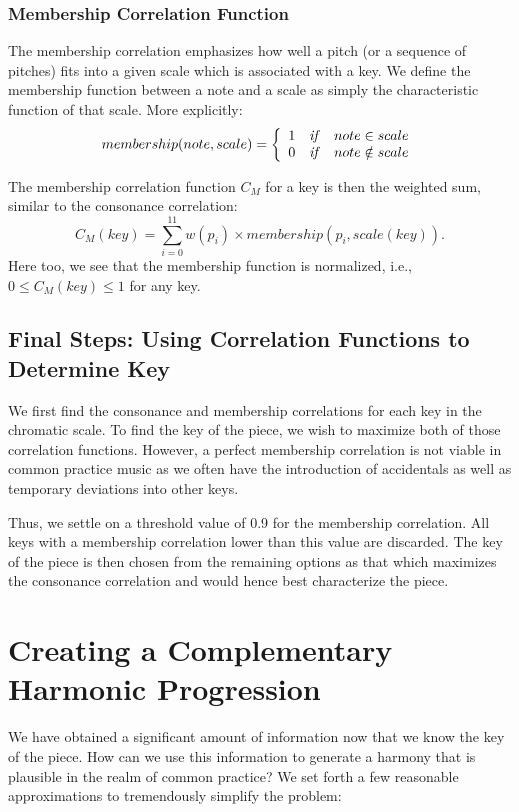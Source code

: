 \documentclass[11pt]{article}
\begin{document}
\subsubsection{Membership Correlation Function}
The membership correlation emphasizes how well a pitch (or a sequence of pitches) fits into a given scale which is associated with a key. We define the membership function between a note and a scale as simply the characteristic function of that scale. More explicitly:
\begin{equation*}
membership(note, scale) =  \left\{
\begin{array}{ccc}
1 & \text{\emph{if}} & note \in scale \\
0 & \text{\emph{if}} & note \notin scale \\
\end{array}
\right.
\end{equation*}

The membership correlation function $C_M$ for a key is then the weighted sum, similar to the consonance correlation:
\[C_M(key) = \sum_{i=0}^{11} w(p_i) \times membership(p_i, scale(key)).\]
Here too, we see that the membership function is normalized, i.e., $0\leq C_M(key) \leq 1$ for any key.

\subsection{Final Steps: Using Correlation Functions to Determine Key}
We first find the consonance and membership correlations for each key in the chromatic scale. To find the key of the piece, we wish to maximize both of those correlation functions. However, a perfect membership correlation is not viable in common practice music as we often have the introduction of accidentals as well as temporary deviations into other keys. 

Thus, we settle on a threshold value of 0.9 for the membership correlation. All keys with a membership correlation lower than this value are discarded. The key of the piece is then chosen from the remaining options as that which maximizes the consonance correlation and would hence best characterize the piece.

\section{Creating a Complementary Harmonic Progression}
We have obtained a significant amount of information now that we know the key of the piece. How can we use this information to generate a harmony that is plausible in the realm of common practice? We set forth a few reasonable approximations to tremendously simplify the problem:
\end{document}
